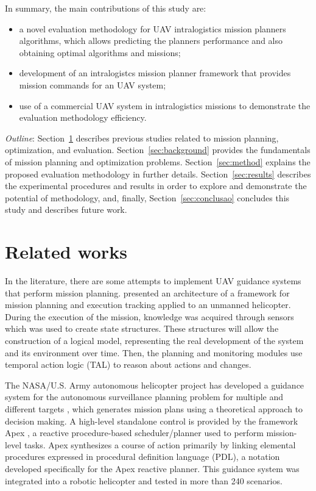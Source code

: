 \documentclass[conference,harvard,brazil,english]{sbatex}
\begin{document}
In summary, the main contributions of this study are:
\begin{itemize}
\item a novel evaluation methodology for UAV intralogistics mission planners algorithms, which allows predicting the planners performance and also obtaining optimal algorithms and missions;
\item development of an intralogistcs mission planner framework that provides mission commands for an UAV system; 
\item use of a commercial UAV system in intralogistics missions to demonstrate the evaluation methodology efficiency.
\end{itemize}

\textit{Outline}: Section~\ref{sec:related} describes previous studies related to mission planning, optimization, and evaluation. Section~\ref{sec:background} provides the fundamentals of mission planning and optimization problems. Section~\ref{sec:method} explains the proposed evaluation methodology in further details. Section~\ref{sec:results} describes the experimental procedures and results in order to explore and demonstrate the potential of methodology, and, finally, Section~\ref{sec:conclusao} concludes this study and describes future work.

\section{Related works}
\label{sec:related}

In the literature, there are some attempts to implement UAV guidance systems that perform mission planning.  presented an architecture of a framework for mission planning and execution tracking applied to an unmanned helicopter. During the execution of the mission, knowledge was acquired through sensors which was used to create state structures. These structures will allow the construction of a logical model, representing the real development of the system and its environment over time. Then, the planning and monitoring modules use temporal action logic (TAL) to reason about actions and changes.

The NASA/U.S. Army autonomous helicopter project has developed a guidance system for the autonomous surveillance planning problem for multiple and different targets \cite{whalley2005design}, which generates mission plans using a theoretical approach to decision making. A high-level standalone control is provided by the framework Apex \cite{baer1998nasa}, a reactive procedure-based scheduler/planner used to perform mission-level tasks. Apex synthesizes a course of action primarily by linking elemental procedures expressed in procedural definition language (PDL), a notation developed specifically for the Apex reactive planner. This guidance system was integrated into a robotic helicopter and tested in more than 240 scenarios.
\end{document}
